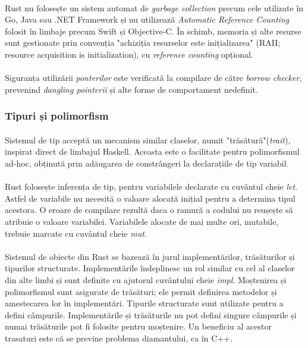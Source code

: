         \paragraph{} Rust nu folosește un sistem automat de \textit{garbage collection} precum cele utilizate în Go, Java sau .NET Framework și nu utilizează \textit{Automatic Reference Counting} folosit în limbaje precum Swift și Objective-C. În schimb, memoria și alte resurse sunt gestionate prin convenția "achiziția resurselor este inițializarea" (RAII; resource acquisition is initialization), cu \textit{reference counting} opțional. \cite{wiki:rust}
        \paragraph{} Siguranța utilizării \textit{ponterilor} este verificată la compilare de către \textit{borrow checker}, prevenind \textit{dangling pointerii} și alte forme de comportament nedefinit. \cite{wiki:rust}

    \subsubsection{Tipuri și polimorfism}
        \paragraph{} Sistemul de tip acceptă un mecanism similar claselor, numit "trăsătură"(\textit{trait}), inspirat direct de limbajul Haskell. Aceasta este o facilitate pentru polimorfismul ad-hoc, obținută prin adăugarea de constrângeri la declarațiile de tip variabil. \cite{wiki:rust}
        \paragraph{} Rust folosește inferența de tip, pentru variabilele declarate cu cuvântul cheie \textit{let}. Astfel de variabile nu necesită o valoare alocată inițial pentru a determina tipul acestora. O eroare de compilare rezultă daca o ramură a codului nu reușește să atribuie o valoare variabilei. Variabilele alocate de mai multe ori, mutabile, trebuie marcate cu cuvântul cheie \textit{mut}. \cite{wiki:rust}
        \paragraph{} Sistemul de obiecte din Rust se bazează în jurul implementărilor, trăsăturilor și tipurilor structurate. Implementările îndeplinesc un rol similar cu cel al claselor din alte limbi și sunt definite cu ajutorul cuvântului cheie \textit{impl}. Moștenirea și polimorfismul sunt asigurate de trăsături; ele permit definirea metodelor și amestecarea lor în implementări. Tipurile structurate sunt utilizate pentru a defini câmpurile. Implementările și trăsăturile nu pot defini singure câmpurile și numai trăsăturile pot fi folosite pentru moștenire. Un beneficiu al acestor trasaturi este că se previne problema diamantului, ca în C++. \cite{wiki:rust}